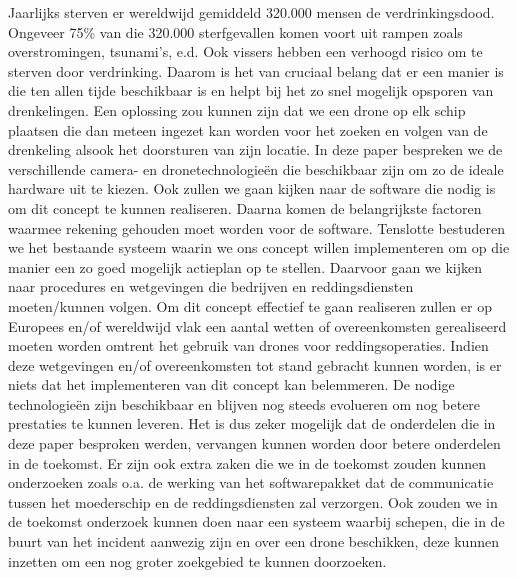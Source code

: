 Jaarlijks sterven er wereldwijd gemiddeld 320.000 mensen de verdrinkingsdood. Ongeveer 75\% van die 320.000 sterfgevallen komen voort uit rampen zoals overstromingen, tsunami's, e.d. Ook vissers hebben een verhoogd risico om te sterven door verdrinking. Daarom is het van cruciaal belang dat er een manier is die ten allen tijde beschikbaar is en helpt bij het zo snel mogelijk opsporen van drenkelingen. Een oplossing zou kunnen zijn dat we een drone op elk schip plaatsen die dan meteen ingezet kan worden voor het zoeken en volgen van de drenkeling alsook het doorsturen van zijn locatie. In deze paper bespreken we de verschillende camera- en dronetechnologieën die beschikbaar zijn om zo de ideale hardware uit te kiezen. Ook zullen we gaan kijken naar de software die nodig is om dit concept te kunnen realiseren. Daarna komen de belangrijkste factoren waarmee rekening gehouden moet worden voor de software.
Tenslotte bestuderen we het bestaande systeem waarin we ons concept willen implementeren om op die manier een zo goed mogelijk actieplan op te stellen. Daarvoor gaan we kijken naar procedures en wetgevingen die bedrijven en reddingsdiensten moeten/kunnen volgen. Om dit concept effectief te gaan realiseren zullen er op Europees en/of wereldwijd vlak een aantal wetten of overeenkomsten gerealiseerd moeten worden omtrent het gebruik van drones voor reddingsoperaties. Indien deze wetgevingen en/of overeenkomsten tot stand gebracht kunnen worden, is er niets dat het implementeren van dit concept kan belemmeren. De nodige technologieën zijn beschikbaar en blijven nog steeds evolueren om nog betere prestaties te kunnen leveren. Het is dus zeker mogelijk dat de onderdelen die in deze paper besproken werden, vervangen kunnen worden door betere onderdelen in de toekomst. Er zijn ook extra zaken die we in de toekomst zouden kunnen onderzoeken zoals o.a. de werking van het softwarepakket dat de communicatie tussen het moederschip en de reddingsdiensten zal verzorgen. Ook zouden we in de toekomst onderzoek kunnen doen naar een systeem waarbij schepen, die in de buurt van het incident aanwezig zijn en over een drone beschikken, deze kunnen inzetten om een nog groter zoekgebied te kunnen doorzoeken.

